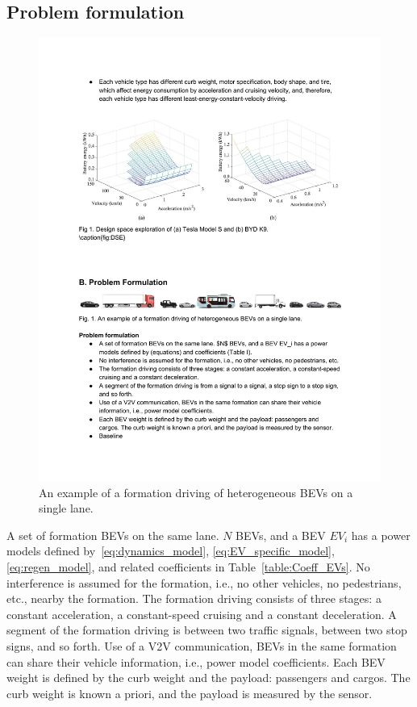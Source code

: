 \documentclass{IEEEtran}
\begin{document}
\subsection{Problem formulation} \label{subsec:problem}

\begin{figure}	%
\centering
\includegraphics[width=1.0\hsize]{Figures/Example.pdf}
\caption{An example of a formation driving of heterogeneous BEVs on a single lane.}
\label{fig:example}
\end{figure} 

A set of formation BEVs on the same lane. $N$ BEVs, and a BEV $EV_i$ has a power models defined by~\eqref{eq:dynamics_model}, \eqref{eq:EV_specific_model}, \eqref{eq:regen_model}, and related coefficients in Table~\ref{table:Coeff_EVs}.
No interference is assumed for the formation, i.e., no other vehicles, no pedestrians, etc., nearby the formation.
The formation driving consists of three stages: a constant acceleration, a constant-speed cruising and a constant deceleration.
A segment of the formation driving is between two traffic signals, between two stop signs, and so forth.
Use of a V2V communication, BEVs in the same formation can share their vehicle information, i.e., power model coefficients.
Each BEV weight is defined by the curb weight and the payload: passengers and cargos. The curb weight is known a priori, and the payload is measured by the sensor. 
\end{document}
